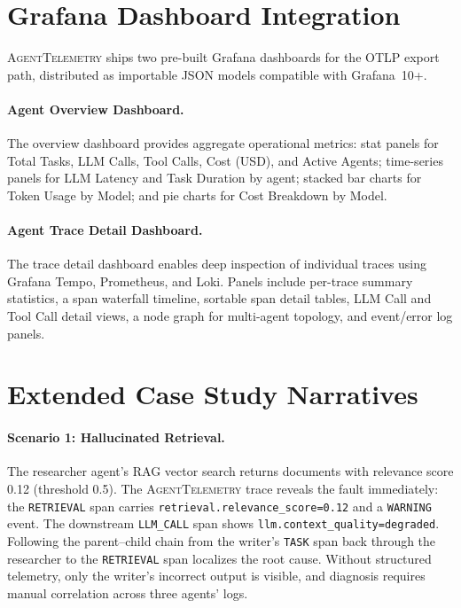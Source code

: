 \documentclass[sigplan,10pt,screen]{acmart}
\begin{document}
\section{Grafana Dashboard Integration}
\label{app:dashboards}

\textsc{AgentTelemetry} ships two pre-built Grafana dashboards for the OTLP export path, distributed as importable JSON models compatible with Grafana~10+.

\paragraph{Agent Overview Dashboard.}
The overview dashboard provides aggregate operational metrics: stat panels for Total Tasks, LLM Calls, Tool Calls, Cost (USD), and Active Agents; time-series panels for LLM Latency and Task Duration by agent; stacked bar charts for Token Usage by Model; and pie charts for Cost Breakdown by Model.

\paragraph{Agent Trace Detail Dashboard.}
The trace detail dashboard enables deep inspection of individual traces using Grafana Tempo, Prometheus, and Loki.  Panels include per-trace summary statistics, a span waterfall timeline, sortable span detail tables, LLM Call and Tool Call detail views, a node graph for multi-agent topology, and event/error log panels.

\section{Extended Case Study Narratives}
\label{app:casestudy}

\paragraph{Scenario 1: Hallucinated Retrieval.}
The researcher agent's RAG vector search returns documents with relevance score 0.12 (threshold 0.5).  The \textsc{AgentTelemetry} trace reveals the fault immediately: the \texttt{RETRIEVAL} span carries \texttt{retrieval.relevance\_score=0.12} and a \texttt{WARNING} event.  The downstream \texttt{LLM\_CALL} span shows \texttt{llm.context\_quality=degraded}.  Following the parent--child chain from the writer's \texttt{TASK} span back through the researcher to the \texttt{RETRIEVAL} span localizes the root cause.  Without structured telemetry, only the writer's incorrect output is visible, and diagnosis requires manual correlation across three agents' logs.
\end{document}
